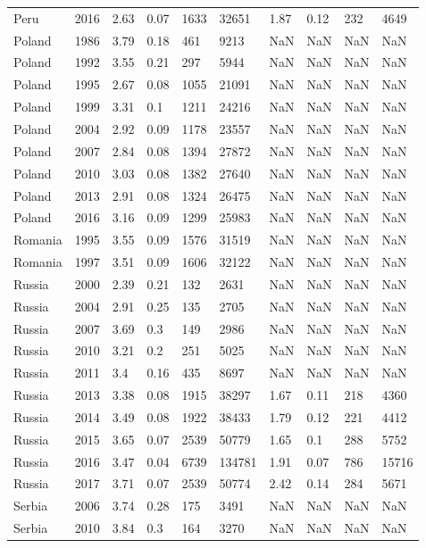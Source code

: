 \begin{tabular}{llllllllll}
Peru & 2016 & 2.63 & 0.07 & 1633 & 32651 & 1.87 & 0.12 & 232 & 4649 \\ 
Poland & 1986 & 3.79 & 0.18 & 461 & 9213 & NaN & NaN & NaN & NaN \\ 
Poland & 1992 & 3.55 & 0.21 & 297 & 5944 & NaN & NaN & NaN & NaN \\ 
Poland & 1995 & 2.67 & 0.08 & 1055 & 21091 & NaN & NaN & NaN & NaN \\ 
Poland & 1999 & 3.31 & 0.1 & 1211 & 24216 & NaN & NaN & NaN & NaN \\ 
Poland & 2004 & 2.92 & 0.09 & 1178 & 23557 & NaN & NaN & NaN & NaN \\ 
Poland & 2007 & 2.84 & 0.08 & 1394 & 27872 & NaN & NaN & NaN & NaN \\ 
Poland & 2010 & 3.03 & 0.08 & 1382 & 27640 & NaN & NaN & NaN & NaN \\ 
Poland & 2013 & 2.91 & 0.08 & 1324 & 26475 & NaN & NaN & NaN & NaN \\ 
Poland & 2016 & 3.16 & 0.09 & 1299 & 25983 & NaN & NaN & NaN & NaN \\ 
Romania & 1995 & 3.55 & 0.09 & 1576 & 31519 & NaN & NaN & NaN & NaN \\ 
Romania & 1997 & 3.51 & 0.09 & 1606 & 32122 & NaN & NaN & NaN & NaN \\ 
Russia & 2000 & 2.39 & 0.21 & 132 & 2631 & NaN & NaN & NaN & NaN \\ 
Russia & 2004 & 2.91 & 0.25 & 135 & 2705 & NaN & NaN & NaN & NaN \\ 
Russia & 2007 & 3.69 & 0.3 & 149 & 2986 & NaN & NaN & NaN & NaN \\ 
Russia & 2010 & 3.21 & 0.2 & 251 & 5025 & NaN & NaN & NaN & NaN \\ 
Russia & 2011 & 3.4 & 0.16 & 435 & 8697 & NaN & NaN & NaN & NaN \\ 
Russia & 2013 & 3.38 & 0.08 & 1915 & 38297 & 1.67 & 0.11 & 218 & 4360 \\ 
Russia & 2014 & 3.49 & 0.08 & 1922 & 38433 & 1.79 & 0.12 & 221 & 4412 \\ 
Russia & 2015 & 3.65 & 0.07 & 2539 & 50779 & 1.65 & 0.1 & 288 & 5752 \\ 
Russia & 2016 & 3.47 & 0.04 & 6739 & 134781 & 1.91 & 0.07 & 786 & 15716 \\ 
Russia & 2017 & 3.71 & 0.07 & 2539 & 50774 & 2.42 & 0.14 & 284 & 5671 \\ 
Serbia & 2006 & 3.74 & 0.28 & 175 & 3491 & NaN & NaN & NaN & NaN \\ 
Serbia & 2010 & 3.84 & 0.3 & 164 & 3270 & NaN & NaN & NaN & NaN \\ 

\end{tabular}
